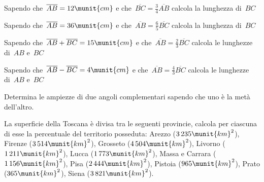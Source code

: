 \begin{htmulticols}{2}
 \begin{esercizio}
 \label{ese:3.99}
Sapendo che~\(\overline{AB}=12\munit{cm}\) e che~\(\overline{BC}=\frac{3}{4}
\overline{AB}\) calcola la lunghezza di~\(BC\)
\end{esercizio}

\begin{esercizio}
 \label{ese:3.100}
Sapendo che~\(\overline{AB}=36\munit{cm}\) e che~\(\overline{AB}=\frac{6}{5}
\overline{BC}\) calcola la lunghezza di~\(BC\)
\end{esercizio}

\begin{esercizio}
 \label{ese:3.101}
Sapendo che~\(\overline{AB}+\overline{BC}=15\munit{cm}\) e 
che~\(\overline{AB}=
\frac{2}{3}\overline{BC}\) calcola le lunghezze di~\(AB\) e~\(BC\)
\end{esercizio}

\begin{esercizio}
 \label{ese:3.102}
Sapendo che~\(\overline{AB}-\overline{BC}=4\munit{cm}\) e che~\(\overline{AB}=
\frac{4}{3}\overline{BC}\) calcola le lunghezze di~\(AB\) e~\(BC\)
\end{esercizio}

\begin{esercizio}
 \label{ese:3.103}
Determina le ampiezze di due angoli complementari sapendo che uno è la metà 
dell'altro.
\end{esercizio}

% 

\begin{esercizio}
 \label{ese:3.106}
La superficie della Toscana è divisa tra le seguenti provincie, calcola per 
ciascuna di esse la percentuale del territorio posseduta: 
Arezzo (\(3\,235\munit{km}^2\)), Firenze (\(3\,514\munit{km}^2\)),
Grosseto (\(4\,504\munit{km}^2\)), Livorno (\(1\,211\munit{km}^2\)), 
Lucca (\(1\,773\munit{km}^2\)), Massa e Carrara (\(1\,156\munit{km}^2\)), 
Pisa (\(2\,444\munit{km}^2\)), Pistoia (\(965\munit{km}^2\)),
Prato (\(365\munit{km}^2\)), Siena (\(3\,821\munit{km}^2\)).
\end{esercizio}


\end{htmulticols}

